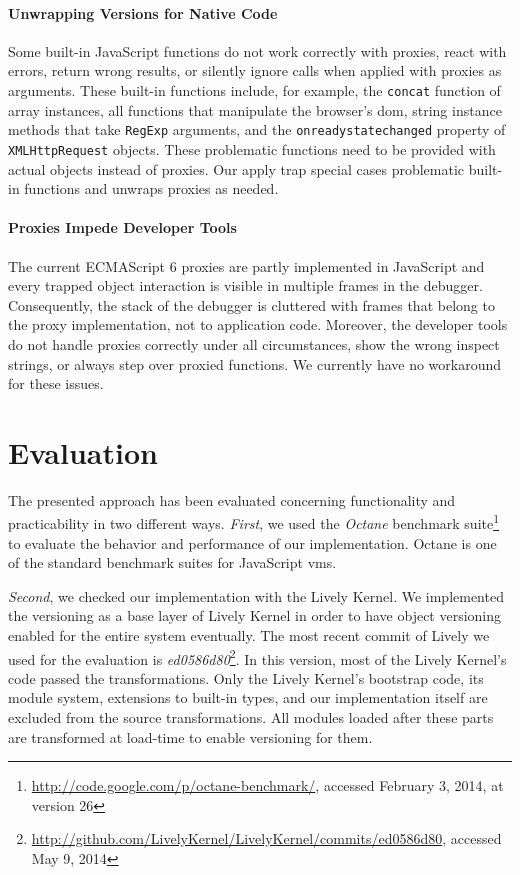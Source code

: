 \documentclass{sigplanconf}
\newcommand{\ac}[1]{\gls{#1}}
\newcommand{\acp}[1]{\glspl{#1}}
\begin{document}
\paragraph{Unwrapping Versions for Native Code} \label{subsec:IMPLEMENTATION:4.3}
Some built-in JavaScript functions do not work correctly with proxies, react with errors, return wrong results, or silently ignore calls when applied with proxies as arguments.
These built-in functions include, for example, the \lstinline{concat} function of array instances, all functions that manipulate the browser's \ac{dom}, string instance methods that take \lstinline{RegExp} arguments, and the \lstinline{onreadystatechanged} property of \lstinline{XMLHttpRequest} objects.
These problematic functions need to be provided with actual objects instead of proxies.
Our apply trap special cases problematic built-in functions and unwraps proxies as needed.

\paragraph{Proxies Impede Developer Tools}
The current ECMAScript 6 proxies are partly implemented in JavaScript and every trapped object interaction is visible in multiple frames in the debugger.
Consequently, the stack of the debugger is cluttered with frames that belong to the proxy implementation, not to application code.
Moreover, the developer tools do not handle proxies correctly under all circumstances, show the wrong inspect strings, or always step over proxied functions.
We currently have no workaround for these issues.


\section{Evaluation} \label{chapter:EVALUATION}

The presented approach has been evaluated concerning functionality and
practicability in two different ways. \emph{First}, we used the
\emph{Octane} benchmark
suite\footnote{\url{http://code.google.com/p/octane-benchmark/},
  accessed February 3, 2014, at version 26} to evaluate the behavior
and performance of our implementation. Octane is one of the standard
benchmark suites for JavaScript \acp{vm}.

\emph{Second}, we checked our implementation with the Lively Kernel. We
implemented the versioning as a base layer of Lively Kernel in order
to have object versioning enabled for the entire system
eventually. The most recent commit of Lively we used for the
evaluation is
\emph{ed0586d80}\footnote{\url{http://github.com/LivelyKernel/LivelyKernel/commits/ed0586d80},
  accessed May 9, 2014}. In this version, most of the Lively Kernel's
code passed the transformations.  Only the Lively Kernel's bootstrap
code, its module system, extensions to built-in types, and our
implementation itself are excluded from the source transformations.
All modules loaded after these parts are transformed at load-time to
enable versioning for them. 
\end{document}
